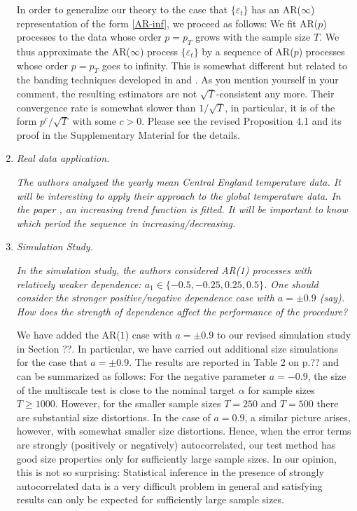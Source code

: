 \documentclass[a4paper,12pt]{article}
\begin{document}
\begin{enumerate}[label=(\arabic*),leftmargin=0.8cm]
In order to generalize our theory to the case that $\{\varepsilon_t\}$ has an AR($\infty$) representation of the form \eqref{AR-inf}, we proceed as follows: We fit AR($p$) processes to the data whose order $p=p_T$ grows with the sample size $T$. We thus approximate the AR($\infty$) process $\{\varepsilon_t\}$ by a sequence of AR($p$) processes whose order $p=p_T$ goes to infinity. This is somewhat different but related to the banding techniques developed in \cite{WuPourahmadi2009} and \cite{XiaoWu2012}. As you mention yourself in your comment, the resulting estimators are not $\sqrt{T}$-consistent any more. Their convergence rate is somewhat slower than $1/\sqrt{T}$, in particular, it is of the form $p^c/\sqrt{T}$ with some $c > 0$. Please see the revised Proposition 4.1 and its proof in the Supplementary Material for the details. 


\item \textit{Real data application.}

\textit{The authors analyzed the yearly mean Central England temperature data. It will be interesting to apply their approach to the global temperature data. In the paper \cite{WuWoodroofeMentz2001}, an increasing trend function is fitted. It will be important to know which period the sequence in increasing/decreasing.}


\item \textit{Simulation Study.}

\textit{In the simulation study, the authors considered AR(1) processes with relatively weaker dependence: $a_1 \in \{-0.5, -0.25, 0.25, 0.5\}$. One should consider the \linebreak stronger positive/negative dependence case with $a = \pm 0.9$ (say). How does the strength of dependence affect the performance of the procedure?}

We have added the AR($1$) case with $a = \pm 0.9$ to our revised simulation study in Section ??. In particular, we have carried out additional size simulations for the case that $a = \pm 0.9$. The results are reported in Table 2 on p.?? and can be summarized as follows: For the negative parameter $a = -0.9$, the size of the multiscale test is close to the nominal target $\alpha$ for sample sizes $T \ge 1000$. However, for the smaller sample sizes $T=250$ and $T=500$ there are substantial size distortions. In the case of $a = 0.9$, a similar picture arises, however, with somewhat smaller size distortions. Hence, when the error terms are strongly (positively or negatively) autocorrelated, our test method has good size properties only for sufficiently large sample sizes. In our opinion, this is not so surprising: Statistical inference in the presence of strongly autocorrelated data is a very difficult problem in general and satisfying results can only be expected for sufficiently large sample sizes.

\end{enumerate}
\end{document}
